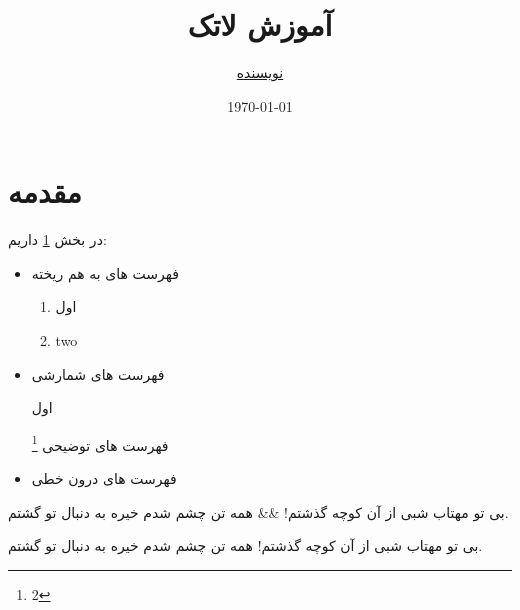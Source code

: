\documentclass{article}
\title{\Nas آموزش لاتک}
\author{\green\underline{نویسنده}}
\date{\today}
\begin{document}
	\maketitle
	\section{مقدمه}\label{a}
	در بخش
	\ref{a}
	 داریم:
	 \begin{itemize}
	 	\item
	 	فهرست های به هم ریخته
	 	\begin{enumerate}
	 		\item اول
	 		\item two
	 	\end{enumerate}
	 	
	 	\item
	 	فهرست های شمارشی
	 	\begin{description}
	 		\item[اول]	 		
 		 	\end{description}

	 	فهرست های توضیحی
	 	\footnote{2}
	 	\item
	 	فهرست های درون خطی
	 \end{itemize}
 	\begin{traditionalpoem}

 بی تو مهتاب شبی از آن کوچه گذشتم!
&&
 	 همه تن چشم شدم خيره به دنبال تو گشتم.
 \end{traditionalpoem}
	\shapepar{\starshape}
		بی تو مهتاب شبی از آن کوچه گذشتم! همه تن چشم شدم خيره به دنبال تو گشتم.
	
 
\end{document}
